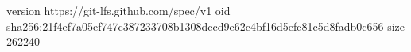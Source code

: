 version https://git-lfs.github.com/spec/v1
oid sha256:21f4ef7a05ef747c387233708b1308dccd9e62c4bf16d5efe81c5d8fadb0c656
size 262240
